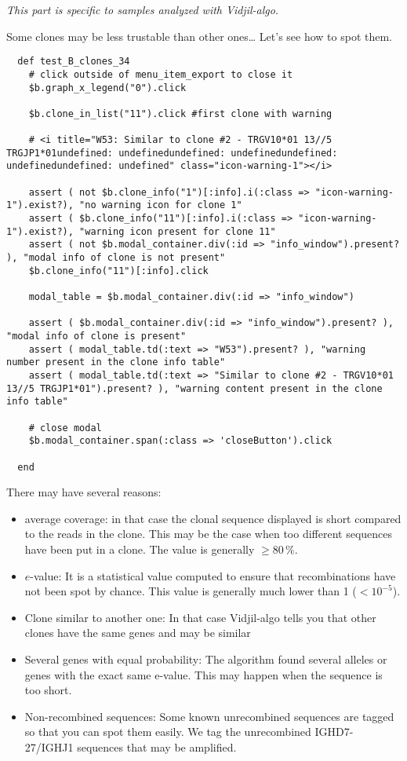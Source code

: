 \bigskip

\textit{This part is specific to samples analyzed with Vidjil-algo.}

Some clones may be less trustable than other ones\dots{} Let's see how to spot them.
\begin{verbatim}
  def test_B_clones_34
    # click outside of menu_item_export to close it
    $b.graph_x_legend("0").click

    $b.clone_in_list("11").click #first clone with warning

    # <i title="W53: Similar to clone #2 - TRGV10*01 13//5 TRGJP1*01undefined: undefinedundefined: undefinedundefined: undefinedundefined: undefined" class="icon-warning-1"></i>

    assert ( not $b.clone_info("1")[:info].i(:class => "icon-warning-1").exist?), "no warning icon for clone 1"
    assert ( $b.clone_info("11")[:info].i(:class => "icon-warning-1").exist?), "warning icon present for clone 11"
    assert ( not $b.modal_container.div(:id => "info_window").present? ), "modal info of clone is not present"
    $b.clone_info("11")[:info].click

    modal_table = $b.modal_container.div(:id => "info_window")
    
    assert ( $b.modal_container.div(:id => "info_window").present? ), "modal info of clone is present"
    assert ( modal_table.td(:text => "W53").present? ), "warning number present in the clone info table"
    assert ( modal_table.td(:text => "Similar to clone #2 - TRGV10*01 13//5 TRGJP1*01").present? ), "warning content present in the clone info table"

    # close modal
    $b.modal_container.span(:class => 'closeButton').click

  end
\end{verbatim}

There may have several reasons: 
\begin{itemize}
\item average coverage: in that case the clonal sequence displayed is short
  compared to the reads in the clone. This may be the case when too different
  sequences have been put in a clone. The value is generally $\geq 80\,\%$.
\item $e$-value: It is a statistical value computed to ensure that
  recombinations have not been spot by chance. This value is generally much
  lower than 1 ($<10^{-5}$).
\item Clone similar to another one: In that case Vidjil-algo tells you that
  other clones have the same genes and may be similar
\item Several genes with equal probability: The algorithm found several alleles or genes with the exact same e-value. This may happen when the sequence is too short.
\item Non-recombined sequences: Some known unrecombined sequences are tagged
  so that you can spot them easily. We tag the unrecombined IGHD7-27/IGHJ1
  sequences that may be amplified.
\end{itemize}

